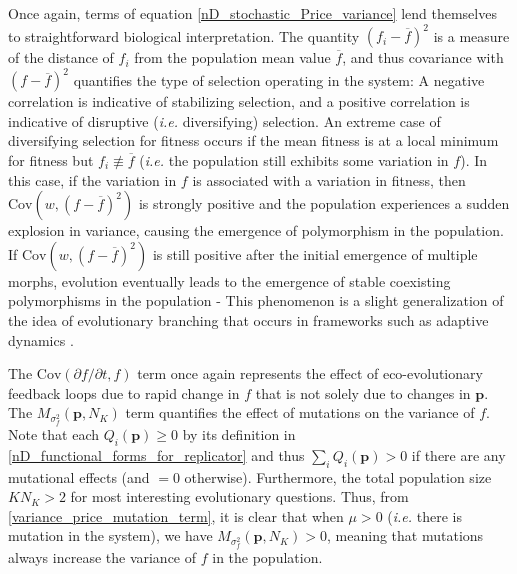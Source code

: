 Once again, terms of equation \eqref{nD_stochastic_Price_variance} lend themselves to straightforward biological interpretation. The quantity $(f_i-\overline{f})^2$ is a measure of the distance of $f_i$ from the population mean value $\overline{f}$, and thus covariance with $(f-\overline{f})^2$ quantifies the type of selection operating in the system: A negative correlation is indicative of stabilizing selection, and a positive correlation is indicative of disruptive (\emph{i.e.} diversifying) selection. An extreme case of diversifying selection for fitness occurs if the mean fitness is at a local minimum for fitness but $f_i \not\equiv \overline{f}$ (\emph{i.e.} the population still exhibits some variation in $f$). In this case, if the variation in $f$ is associated with a variation in fitness, then $\textrm{Cov}(w,(f - \overline{f})^2)$ is strongly positive and the population experiences a sudden explosion in variance, causing the emergence of polymorphism in the population. If $\textrm{Cov}(w,(f - \overline{f})^2)$ is still positive after the initial emergence of multiple morphs, evolution eventually leads to the emergence of stable coexisting polymorphisms in the population - This phenomenon is a slight generalization of the idea of evolutionary branching that occurs in frameworks such as adaptive dynamics \citep{geritz_evolutionarily_1998}.

The $\textrm{Cov}\left(\partial f/\partial t,f\right)$ term once again represents the effect of eco-evolutionary feedback loops due to rapid change in $f$ that is not solely due to changes in $\mathbf{p}$. The $M_{\sigma^2_f}(\mathbf{p},N_K)$ term quantifies the effect of mutations on the variance of $f$. Note that each $Q_i(\mathbf{p}) \geq 0$ by its definition in \eqref{nD_functional_forms_for_replicator} and thus $\sum_i Q_i(\mathbf{p}) > 0$ if there are any mutational effects (and $=0$ otherwise). Furthermore, the total population size $KN_K > 2$ for most interesting evolutionary questions. Thus, from \eqref{variance_price_mutation_term}, it is clear that when $\mu > 0$ (\emph{i.e.} there is mutation in the system), we have $M_{\sigma^2_f}(\mathbf{p},N_K) > 0$, meaning that mutations always increase the variance of $f$ in the population.


